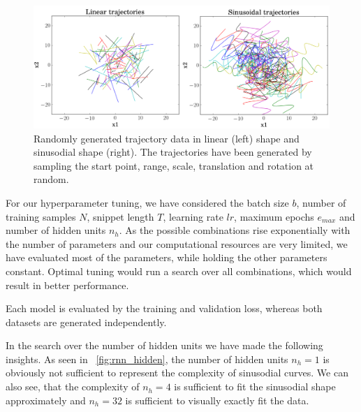 \begin{figure}
	\centering
	\includegraphics [trim=0 0 0 0, clip, angle=0, width=1.0\columnwidth,
	keepaspectratio]{figures/lin_sin_traj}
	\caption{Randomly generated trajectory data in linear (left) shape and sinusodial shape (right). The trajectories have been generated by sampling the start point, range, scale, translation and rotation at random.} 
	\label{fig:lin_sin_traj} 
\end{figure}
For our hyperparameter tuning, we have considered the batch size $b$, number of training samples $N$, snippet length $T$, learning rate $lr$, maximum epochs $e_{max}$ and number of hidden units $n_h$. 
As the possible combinations rise exponentially with the number of parameters and our computational resources are very limited, we have evaluated most of the parameters, while holding the other parameters constant. Optimal tuning would run a search over all combinations, which would result in better performance.

Each model is evaluated by the training and validation loss, whereas both datasets are generated independently.

In the search over the number of hidden units we have made the following insights. As seen in ~\cref{fig:rnn_hidden}, the number of hidden units $n_h = 1$ is obviously not sufficient to represent the complexity of sinusodial curves. We can also see, that the complexity of $n_h=4$ is sufficient to fit the sinusodial shape approximately and $n_h=32$ is sufficient to visually exactly fit the data. 

